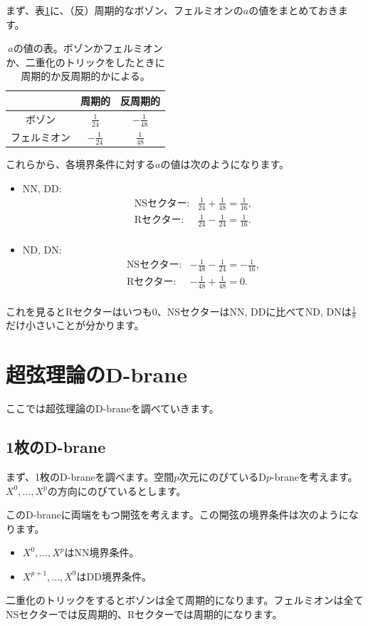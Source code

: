 \documentclass[report,paper=a4, fontsize=12pt, line_length=16cm, number_of_lines=34,dvipdfmx]{jlreq}
\numberwithin{equation}{chapter}
\numberwithin{equation}{section}
\begin{document}
まず、表\ref{tab:bosonfermiona}に、（反）周期的なボゾン、フェルミオンの$a$の値をまとめておきます。
\begin{table}
  \centering
  \begin{tabular}{|c||c|c|}\hline
    & 周期的 & 反周期的 \\ \hline\hline
  ボゾン & $\frac{1}{24}$ & $-\frac{1}{48}$\\ \hline
  フェルミオン & $-\frac{1}{24}$&  $\frac{1}{48}$\\ \hline
  \end{tabular}
  \caption{$a$の値の表。ボゾンかフェルミオンか、二重化のトリックをしたときに周期的か反周期的かによる。}
  \label{tab:bosonfermiona}
\end{table}

これらから、各境界条件に対する$a$の値は次のようになります。
\begin{itemize}
  \item NN, DD: 
  \begin{align}
    \text{NSセクター:}& \frac{1}{24}+\frac{1}{48}=\frac{1}{16}, \nonumber\\
    \text{Rセクター:}& \frac{1}{24}-\frac{1}{24}=\frac{1}{16}. \nonumber\\
  \end{align} 
  \item ND, DN: 
  \begin{align}
    \text{NSセクター:}& -\frac{1}{48}-\frac{1}{24}=-\frac{1}{16}, \nonumber\\
    \text{Rセクター:}& -\frac{1}{48}+\frac{1}{48}=0. \nonumber\\
  \end{align} 
\end{itemize}
これを見るとRセクターはいつも$0$、NSセクターはNN, DDに比べてND, DNは$\frac18$だけ小さいことが分かります。

\section{超弦理論のD-brane}
ここでは超弦理論のD-braneを調べていきます。

\subsection{1枚のD-brane}
まず、1枚のD-braneを調べます。空間$p$次元にのびているD$p$-braneを考えます。$X^{0},\dots,X^{p}$の方向にのびているとします。

このD-braneに両端をもつ開弦を考えます。この開弦の境界条件は次のようになります。
\begin{itemize}
  \item $X^{0},\dots,X^{p}$はNN境界条件。
  \item $X^{p+1},\dots,X^{9}$はDD境界条件。
\end{itemize}
二重化のトリックをするとボゾンは全て周期的になります。フェルミオンは全てNSセクターでは反周期的、Rセクターでは周期的になります。
\end{document}
